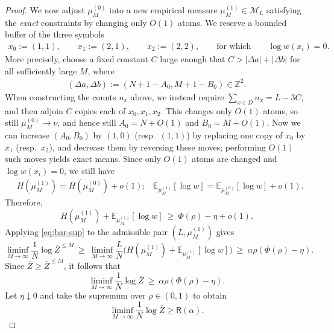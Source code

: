 \documentclass[11pt]{amsart}
\numberwithin{equation}{section}
\numberwithin{equation}{section}
\newcommand{\1}{\mathbbm{1}}
\newcommand{\E}{\mathbb{E}}
\newcommand{\Z}{\mathbb{Z}}
\theoremstyle{definition}
\begin{document}
\begin{proof}
We now adjust $\mu_M^{(0)}$ into a new empirical measure $\mu_M^{(1)}\in\mathcal M_L$ satisfying the \emph{exact} constraints by changing only $O(1)$ atoms. We reserve a bounded buffer of the three symbols
\begin{align*}
    x_0:=(1,1),\qquad x_1:=(2,1),\qquad x_2:=(2,2), \qquad\text{for which}\qquad \log w(x_i)=0.
\end{align*}
More precisely, choose a fixed constant $C$ large enough that $C>|\Delta a|+|\Delta b|$ for all sufficiently large $M$, where
\begin{align*}
    (\Delta a,\Delta b):=(N+1-A_0,M+1-B_0)\in\Z^2.
\end{align*}
When constructing the counts $n_x$ above, we instead require $\sum_{x\in D} n_x=L-3C$, and then adjoin $C$ copies each of $x_0,x_1,x_2$. This changes only $O(1)$ atoms, so still $\mu_M^{(0)}\to\nu$, and hence still $A_0=N+O(1)$ and $B_0=M+O(1)$. Now we can increase $(A_0,B_0)$ by $(1,0)$ (resp.\ $(1,1)$) by replacing one copy of $x_0$ by $x_1$ (resp.\ $x_2$), and decrease them by reversing these moves; performing $O(1)$ such moves yields exact means. Since only $O(1)$ atoms are changed and $\log w(x_i)=0$, we still have
\begin{align*}
    & H(\mu_M^{(1)})=H(\mu_M^{(0)})+o(1);
    & \E_{\mu_M^{(1)}}[\log w]=\E_{\mu_M^{(0)}}[\log w]+o(1).
\end{align*}
Therefore,
\[
H(\mu_M^{(1)})+\E_{\mu_M^{(1)}}[\log w]\ \ge\ \Phi(\rho)-\eta+o(1).
\]
Applying \eqref{eq:bar-sup} to the admissible pair $(L,\mu_M^{(1)})$ gives
\[
\liminf_{M\to\infty}\frac{1}{N}\log \overline{Z}^{\le M}
\ \ge\ \liminf_{M\to\infty}\frac{L}{N}\Big(H(\mu_M^{(1)})+\E_{\mu_M^{(1)}}[\log w]\Big)
\ \ge\ \alpha\rho(\Phi(\rho)-\eta).
\]
Since $\overline Z\ge \overline Z^{\le M}$, it follows that
\[
\liminf_{M\to\infty}\frac{1}{N}\log \overline{Z}
\ \ge\ \alpha\rho(\Phi(\rho)-\eta).
\]
Let $\eta\downarrow 0$ and take the supremum over $\rho\in(0,1)$ to obtain
\begin{equation}\label{eq:liminf-full}
\liminf_{M\to\infty}\frac{1}{N}\log \overline{Z}\ge \mathsf R(\alpha).
\end{equation}


\end{proof}
\end{document}
